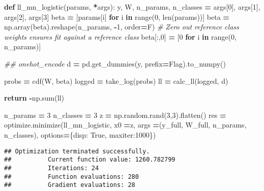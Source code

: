 \documentclass[
]{book}
\newenvironment{Shaded}{\begin{snugshade}}{\end{snugshade}}
\newcommand{\BuiltInTok}[1]{#1}
\newcommand{\CommentTok}[1]{\textcolor[rgb]{0.56,0.35,0.01}{\textit{#1}}}
\newcommand{\ControlFlowTok}[1]{\textcolor[rgb]{0.13,0.29,0.53}{\textbf{#1}}}
\newcommand{\DecValTok}[1]{\textcolor[rgb]{0.00,0.00,0.81}{#1}}
\newcommand{\KeywordTok}[1]{\textcolor[rgb]{0.13,0.29,0.53}{\textbf{#1}}}
\newcommand{\NormalTok}[1]{#1}
\newcommand{\OperatorTok}[1]{\textcolor[rgb]{0.81,0.36,0.00}{\textbf{#1}}}
\newcommand{\StringTok}[1]{\textcolor[rgb]{0.31,0.60,0.02}{#1}}
\newcommand{\VariableTok}[1]{\textcolor[rgb]{0.00,0.00,0.00}{#1}}
\theoremstyle{definition}
\theoremstyle{definition}
\theoremstyle{definition}
\theoremstyle{remark}
\begin{document}
\begin{Shaded}
\begin{Highlighting}[]
\KeywordTok{def}\NormalTok{ ll\_mn\_logistic(params, }\OperatorTok{*}\NormalTok{args):}
\NormalTok{    y, W, n\_params, n\_classes }\OperatorTok{=}\NormalTok{ args[}\DecValTok{0}\NormalTok{], args[}\DecValTok{1}\NormalTok{], args[}\DecValTok{2}\NormalTok{], args[}\DecValTok{3}\NormalTok{]}
\NormalTok{    beta }\OperatorTok{=}\NormalTok{ [params[i] }\ControlFlowTok{for}\NormalTok{ i }\KeywordTok{in} \BuiltInTok{range}\NormalTok{(}\DecValTok{0}\NormalTok{, }\BuiltInTok{len}\NormalTok{(params))]}
\NormalTok{    beta }\OperatorTok{=}\NormalTok{ np.array(beta).reshape(n\_params, }\OperatorTok{{-}}\DecValTok{1}\NormalTok{, order}\OperatorTok{=}\StringTok{\textquotesingle{}F\textquotesingle{}}\NormalTok{)}
    \CommentTok{\# Zero out reference class weights ensures fit against a reference class}
\NormalTok{    beta[:,}\DecValTok{0}\NormalTok{] }\OperatorTok{=}\NormalTok{ [}\DecValTok{0} \ControlFlowTok{for}\NormalTok{ i }\KeywordTok{in} \BuiltInTok{range}\NormalTok{(}\DecValTok{0}\NormalTok{, n\_params)]}
    
    \CommentTok{\#\# onehot\_encode}
\NormalTok{    d }\OperatorTok{=}\NormalTok{ pd.get\_dummies(y, prefix}\OperatorTok{=}\StringTok{\textquotesingle{}Flag\textquotesingle{}}\NormalTok{).to\_numpy()}
    
\NormalTok{    probs }\OperatorTok{=}\NormalTok{ cdf(W, beta)}
\NormalTok{    logged }\OperatorTok{=}\NormalTok{ take\_log(probs)}
\NormalTok{    ll }\OperatorTok{=}\NormalTok{ calc\_ll(logged, d)}
    
    \ControlFlowTok{return} \OperatorTok{{-}}\NormalTok{np.}\BuiltInTok{sum}\NormalTok{(ll)}

\NormalTok{n\_params }\OperatorTok{=} \DecValTok{3} 
\NormalTok{n\_classes }\OperatorTok{=} \DecValTok{3}
\NormalTok{z }\OperatorTok{=}\NormalTok{ np.random.rand(}\DecValTok{3}\NormalTok{,}\DecValTok{3}\NormalTok{).flatten()}
\NormalTok{res }\OperatorTok{=}\NormalTok{ optimize.minimize(ll\_mn\_logistic, x0 }\OperatorTok{=}\NormalTok{z, args }\OperatorTok{=}\NormalTok{(y\_full, W\_full, n\_params, n\_classes), options}\OperatorTok{=}\NormalTok{\{}\StringTok{\textquotesingle{}disp\textquotesingle{}}\NormalTok{: }\VariableTok{True}\NormalTok{, }\StringTok{\textquotesingle{}maxiter\textquotesingle{}}\NormalTok{:}\DecValTok{1000}\NormalTok{\})}
\end{Highlighting}
\end{Shaded}

\begin{verbatim}
## Optimization terminated successfully.
##          Current function value: 1260.782799
##          Iterations: 24
##          Function evaluations: 280
##          Gradient evaluations: 28
\end{verbatim}
\end{document}

